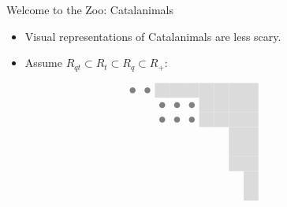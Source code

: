 \documentclass{beamer}
\newcounter{c}
\begin{document}
\begin{frame}{Welcome to the Zoo: Catalanimals}
  \begin{itemize}
  \item Visual representations of Catalanimals are less scary.\pause
  \item Assume \(R_{qt} \subset R_t \subset R_q \subset R_+\):\pause
  \end{itemize}
\[
\begin{array}{@{\hspace{0.2mm}}c@{\quad\quad}cr}
\begin{tikzpicture}[scale = .47]
\begin{scope}
\draw[draw = none, fill = black!14] (4,-1) rectangle (5,-2);
 \draw[draw = none, fill = black!14] (5,-1) rectangle (6,-2);
 \draw[draw = none, fill = black!14] (6,-1) rectangle (7,-2);
 \draw[draw = none, fill = black!14] (7,-1) rectangle (8,-2);
 \draw[draw = none, fill = black!14] (7,-2) rectangle (8,-3);
 \draw[draw = none, fill = black!14] (7,-3) rectangle (8,-4);
 \draw[draw = none, fill = black!14] (8,-1) rectangle (9,-2);
 \draw[draw = none, fill = black!14] (8,-2) rectangle (9,-3);
 \draw[draw = none, fill = black!14] (8,-3) rectangle (9,-4);
 \draw[draw = none, fill = black!14] (9,-1) rectangle (10,-2);
 \draw[draw = none, fill = black!14] (9,-2) rectangle (10,-3);
 \draw[draw = none, fill = black!14] (9,-3) rectangle (10,-4);
 \draw[draw = none, fill = black!14] (9,-4) rectangle (10,-5);
 \draw[draw = none, fill = black!14] (9,-5) rectangle (10,-6);
 \draw[draw = none, fill = black!14] (9,-6) rectangle (10,-7);
 \draw[draw = none, fill = black!14] (10,-1) rectangle (11,-2);
 \draw[draw = none, fill = black!14] (10,-2) rectangle (11,-3);
 \draw[draw = none, fill = black!14] (10,-3) rectangle (11,-4);
 \draw[draw = none, fill = black!14] (10,-4) rectangle (11,-5);
 \draw[draw = none, fill = black!14] (10,-5) rectangle (11,-6);
 \draw[draw = none, fill = black!14] (10,-6) rectangle (11,-7);
 \draw[draw = none, fill = black!14] (10,-7) rectangle (11,-8);
 \draw[draw = none, fill = black!14] (10,-8) rectangle (11,-9);
 \draw[draw = none, fill = gray!100] (2+0.5, -1-0.5) circle (.2);
\draw[draw = none, fill = gray!100] (3+0.5, -1-0.5) circle (.2);
\draw[draw = none, fill = gray!100] (4+0.5, -2-0.5) circle (.2);
\draw[draw = none, fill = gray!100] (5+0.5, -2-0.5) circle (.2);
\draw[draw = none, fill = gray!100] (6+0.5, -2-0.5) circle (.2);
\draw[draw = none, fill = gray!100] (4+0.5, -3-0.5) circle (.2);
\draw[draw = none, fill = gray!100] (5+0.5, -3-0.5) circle (.2);
\draw[draw = none, fill = gray!100] (6+0.5, -3-0.5) circle (.2);

\end{scope}
\end{tikzpicture}
\end{array}\]
\end{frame}
\end{document}
